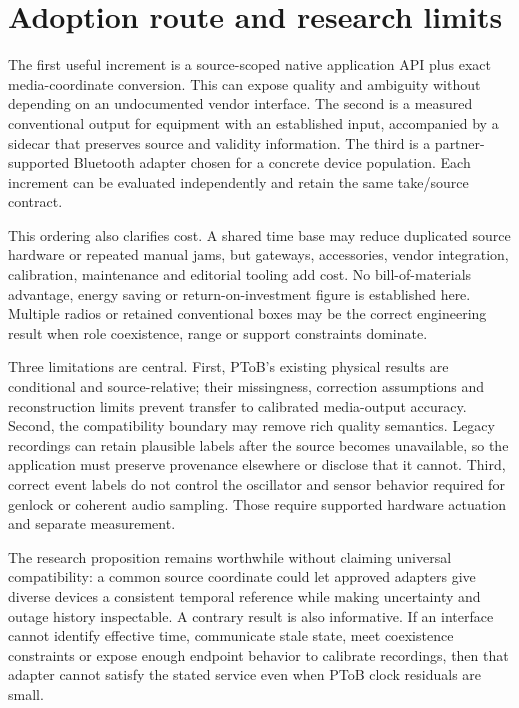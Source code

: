 \documentclass[11pt,letterpaper]{article}
\begin{document}
\section{Adoption route and research limits}
The first useful increment is a source-scoped native application API plus exact media-coordinate conversion. This can expose quality and ambiguity without depending on an undocumented vendor interface. The second is a measured conventional output for equipment with an established input, accompanied by a sidecar that preserves source and validity information. The third is a partner-supported Bluetooth adapter chosen for a concrete device population. Each increment can be evaluated independently and retain the same take/source contract.

This ordering also clarifies cost. A shared time base may reduce duplicated source hardware or repeated manual jams, but gateways, accessories, vendor integration, calibration, maintenance and editorial tooling add cost. No bill-of-materials advantage, energy saving or return-on-investment figure is established here. Multiple radios or retained conventional boxes may be the correct engineering result when role coexistence, range or support constraints dominate.

Three limitations are central. First, PToB's existing physical results are conditional and source-relative; their missingness, correction assumptions and reconstruction limits prevent transfer to calibrated media-output accuracy. Second, the compatibility boundary may remove rich quality semantics. Legacy recordings can retain plausible labels after the source becomes unavailable, so the application must preserve provenance elsewhere or disclose that it cannot. Third, correct event labels do not control the oscillator and sensor behavior required for genlock or coherent audio sampling. Those require supported hardware actuation and separate measurement.

The research proposition remains worthwhile without claiming universal compatibility: a common source coordinate could let approved adapters give diverse devices a consistent temporal reference while making uncertainty and outage history inspectable. A contrary result is also informative. If an interface cannot identify effective time, communicate stale state, meet coexistence constraints or expose enough endpoint behavior to calibrate recordings, then that adapter cannot satisfy the stated service even when PToB clock residuals are small.
\end{document}
